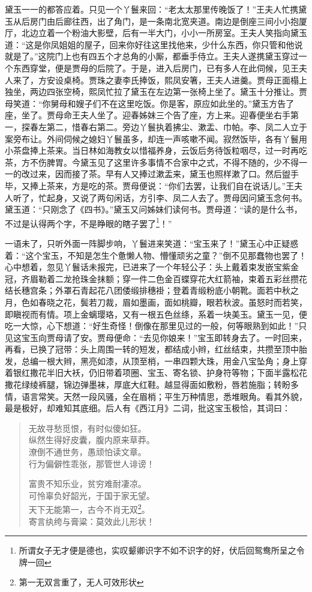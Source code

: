 \documentclass[12pt,oneside]{book}
\newenvironment{shici}{%
\begin{verse}%
\centering\large\hspace{12pt}}%
{\end{verse}}
\begin{document}
黛玉一一的都答应着。只见一个丫鬟来回：“老太太那里传晚饭了！”王夫人忙携黛玉从后房门由后廊往西，出了角门，是一条南北宽夹道。南边是倒座三间小小抱厦厅，北边立着一个粉油大影壁，后有一半大门，小小一所房室。王夫人笑指向黛玉道：“这是你凤姐姐的屋子，回来你好往这里找他来，少什么东西，你只管和他说就是了。”这院门上也有四五个才总角的小厮，都垂手侍立。王夫人遂携黛玉穿过一个东西穿堂，便是贾母的后院了。于是，进入后房门，已有多人在此伺候，见王夫人来了，方安设桌椅。贾珠之妻李氏捧饭，熙凤安箸，王夫人进羹。贾母正面榻上独坐，两边四张空椅，熙凤忙拉了黛玉在左边第一张椅上坐了。黛玉十分推让。贾母笑道：“你舅母和嫂子们不在这里吃饭。你是客，原应如此坐的。”黛玉方告了座，坐了。贾母命王夫人坐了。迎春姊妹三个告了座，方上来。迎春便坐右手第一，探春左第二，惜春右第二。旁边丫鬟执着拂尘、漱盂、巾帕。李、凤二人立于案旁布让。外间伺候之媳妇丫鬟虽多，却连一声咳嗽不闻。寂然饭毕，各有丫鬟用小茶盘捧上茶来。当日林如海教女以惜福养身，云饭后务待饭粒咽尽，过一时再吃茶，方不伤脾胃。今黛玉见了这里许多事情不合家中之式，不得不随的，少不得一一的改过来，因而接了茶。早有人又捧过漱盂来，黛玉也照样漱了口。然后盥手毕，又捧上茶来，方是吃的茶。贾母便说：“你们去罢，让我们自在说话儿。”王夫人听了，忙起身，又说了两句闲话，方引李、凤二人去了。贾母因问黛玉念何书。黛玉道：“只刚念了《四书》。”黛玉又问姊妹们读何书。贾母道：“读的是什么书，不过是认得两个字，不是睁眼的瞎子罢了\footnote{所谓女子无才便是德也，实叹颦卿识字不如不识字的好，伏后回鸳鸯所呈之令牌一回}！”

一语未了，只听外面一阵脚步响，丫鬟进来笑道：“宝玉来了！”黛玉心中正疑惑着：“这个宝玉，不知是怎生个惫懒人物、懵懂顽劣之童？”倒不见那蠢物也罢了！心中想着，忽见丫鬟话未报完，已进来了一个年轻公子：头上戴着束发嵌宝紫金冠，齐眉勒着二龙抢珠金抹额；穿一件二色金百蝶穿花大红箭袖，束着五彩丝攒花结长穗宫条；外罩石青起花八团倭缎排穗褂；登着青缎粉底小朝靴。面若中秋之月，色如春晓之花，鬓若刀裁，眉如墨画，面如桃瓣，眼若秋波。虽怒时而若笑，即瞋视而有情。项上金螭璎珞，又有一根五色丝绦，系着一块美玉。黛玉一见，便吃一大惊，心下想道：“好生奇怪！倒像在那里见过的一般，何等眼熟到如此！”只见这宝玉向贾母请了安。贾母便命：“去见你娘来！”宝玉即转身去了。一时回来，再看，已换了冠带：头上周围一转的短发，都结成小辫，红丝结束，共攒至顶中胎发，总编一根大辫，黑亮如漆，从顶至梢，一串四颗大珠，用金八宝坠角；身上穿着银红撒花半旧大袄，仍旧带着项圈、宝玉、寄名锁、护身符等物；下面半露松花撒花绿绫裤腿，锦边弹墨袜，厚底大红鞋。越显得面如敷粉，唇若施脂；转盼多情，语言常笑。天然一段风骚，全在眉梢；平生万种情思，悉堆眼角。看其外貌，最是极好，却难知其底细。后人有《西江月》二词，批这宝玉极恰，其词曰：

\begin{shici}
无故寻愁觅恨，有时似傻如狂。\\
纵然生得好皮囊，腹内原来草莽。\\
潦倒不通世务，愚顽怕读文章。\\
行为偏僻性乖张，那管世人诽谤！

富贵不知乐业，贫穷难耐凄凉。\\
可怜辜负好韶光，于国于家无望。\\
天下无能第一，古今不肖无双\footnote{第一无双言重了，无人可效形状}。\\
寄言纨绔与膏粱：莫效此儿形状！
\end{shici}
\end{document}

